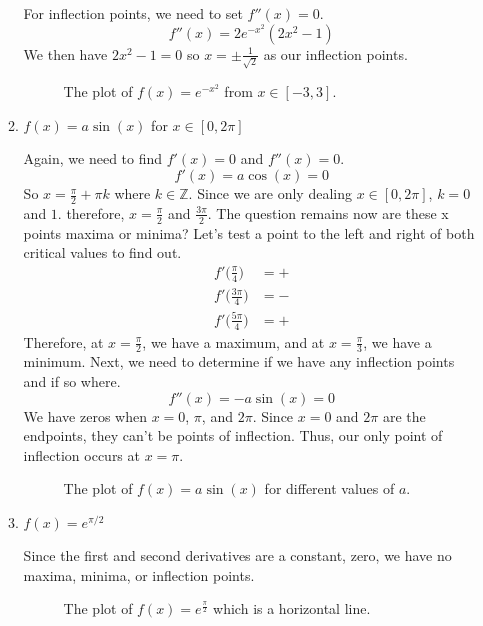 \begin{enumerate}
\begin{enumerate}[label = (\alph*)]
    For inflection points, we need to set \(f''(x) = 0\).
    \[
    f''(x) = 2e^{-x^2}(2x^2 - 1)
    \]
    We then have \(2x^2 - 1 = 0\) so \(x = \pm\frac{1}{\sqrt{2}}\) as our
    inflection points.
    \begin{figure}[H]
      \centering
      
      \caption{The plot of \(f(x) = e^{-x^2}\) from \(x\in[-3, 3]\).}
    \end{figure}
  \item
    \(f(x) = a\sin(x)\) for \(x\in[0, 2\pi]\)
    \par\smallskip
    Again, we need to find \(f'(x) = 0\) and \(f''(x) = 0\).
    \[
    f'(x) = a\cos(x) = 0
    \]
    So \(x = \frac{\pi}{2} + \pi k\) where \(k\in\mathbb{Z}\).
    Since we are only dealing \(x\in[0, 2\pi]\), \(k = 0\) and \(1\).
    therefore, \(x = \frac{\pi}{2}\) and \(\frac{3\pi}{2}\).
    The question remains now are these x points maxima or minima?
    Let's test a point to the left and right of both critical values to find out.
    \begin{align*}
      f'\big(\frac{\pi}{4}\big) &= +\\
      f'\big(\frac{3\pi}{4}\big) &= -\\
      f'\big(\frac{5\pi}{4}\big) &= +
    \end{align*}
    Therefore, at \(x = \frac{\pi}{2}\), we have a maximum, and at
    \(x = \frac{\pi}{3}\), we have a minimum.
    Next, we need to determine if we have any inflection points and if so
    where.
    \[
    f''(x) = -a\sin(x) = 0
    \]
    We have zeros when \(x = 0\), \(\pi\), and \(2\pi\).
    Since \(x = 0\) and \(2\pi\) are the endpoints, they can't be points of
    inflection.
    Thus, our only point of inflection occurs at \(x = \pi\).
    \begin{figure}[H]
      \centering
      
      \caption{The plot of \(f(x) = a\sin(x)\) for different values of \(a\).}
    \end{figure}
  \item
    \(f(x) = e^{\pi/2}\)
    \par\smallskip
    Since the first and second derivatives are a constant, zero, we have no
    maxima, minima, or inflection points.
    \begin{figure}[H]
      \centering
      
      \caption{The plot of \(f(x) = e^{\frac{\pi}{2}}\) which is a horizontal
        line.}

\end{figure}
\end{enumerate}
\end{enumerate}
